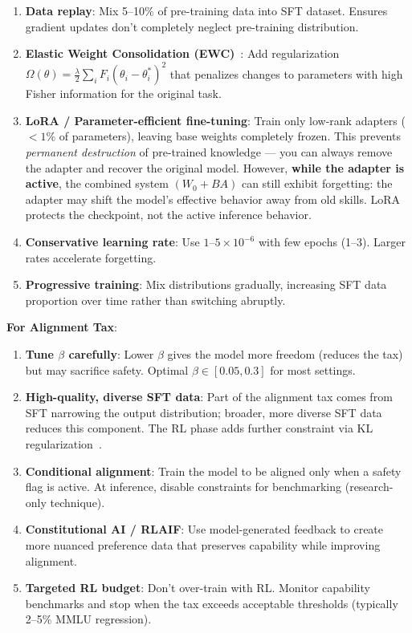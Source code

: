 \begin{enumerate}
  \item \textbf{Data replay}: Mix 5--10\% of pre-training data into SFT dataset. Ensures gradient updates don’t completely neglect pre-training distribution.
  \item \textbf{Elastic Weight Consolidation (EWC)}~\cite{kirkpatrick2017overcoming}: Add regularization $\Omega(\theta) = \frac{\lambda}{2}\sum_i F_i(\theta_i - \theta_i^*)^2$ that penalizes changes to parameters with high Fisher information for the original task.
  \item \textbf{LoRA / Parameter-efficient fine-tuning}: Train only low-rank adapters ($<1\%$ of parameters), leaving base weights completely frozen. This prevents \emph{permanent destruction} of pre-trained knowledge --- you can always remove the adapter and recover the original model. However, \textbf{while the adapter is active}, the combined system $(W_0 + BA)$ can still exhibit forgetting: the adapter may shift the model’s effective behavior away from old skills. LoRA protects the checkpoint, not the active inference behavior.
  \item \textbf{Conservative learning rate}: Use $1$--$5 \times 10^{-6}$ with few epochs (1--3). Larger rates accelerate forgetting.
  \item \textbf{Progressive training}: Mix distributions gradually, increasing SFT data proportion over time rather than switching abruptly.
\end{enumerate}

\textbf{For Alignment Tax}:

\begin{enumerate}
  \item \textbf{Tune $\beta$ carefully}: Lower $\beta$ gives the model more freedom (reduces the tax) but may sacrifice safety. Optimal $\beta \in [0.05, 0.3]$ for most settings.
  \item \textbf{High-quality, diverse SFT data}: Part of the alignment tax comes from SFT narrowing the output distribution; broader, more diverse SFT data reduces this component. The RL phase adds further constraint via KL regularization~\cite{ouyang2022training}.
  \item \textbf{Conditional alignment}: Train the model to be aligned only when a safety flag is active. At inference, disable constraints for benchmarking (research-only technique).
  \item \textbf{Constitutional AI / RLAIF}: Use model-generated feedback to create more nuanced preference data that preserves capability while improving alignment.
  \item \textbf{Targeted RL budget}: Don’t over-train with RL. Monitor capability benchmarks and stop when the tax exceeds acceptable thresholds (typically 2--5\% MMLU regression).
\end{enumerate}


